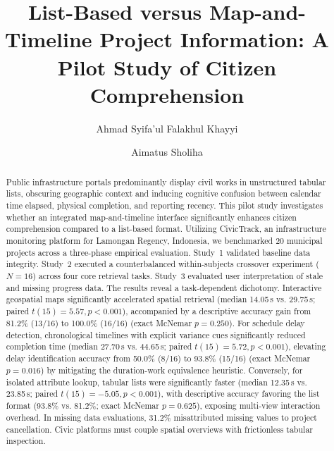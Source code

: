 \documentclass[runningheads]{llncs}
\begin{document}
%
\title{List-Based versus Map-and-Timeline Project Information: A Pilot Study of Citizen Comprehension}
%
%
\author{Ahmad Syifa'ul Falakhul Khayyi \and Aimatus Sholiha}
%
%
%
\maketitle              %
%
\begin{abstract}
Public infrastructure portals predominantly display civil works in unstructured tabular lists, obscuring geographic context and inducing cognitive confusion between calendar time elapsed, physical completion, and reporting recency. This pilot study investigates whether an integrated map-and-timeline interface significantly enhances citizen comprehension compared to a list-based format. Utilizing CivicTrack, an infrastructure monitoring platform for Lamongan Regency, Indonesia, we benchmarked 20 municipal projects across a three-phase empirical evaluation. Study~1 validated baseline data integrity. Study~2 executed a counterbalanced within-subjects crossover experiment ($N = 16$) across four core retrieval tasks. Study~3 evaluated user interpretation of stale and missing progress data. The results reveal a task-dependent dichotomy. Interactive geospatial maps significantly accelerated spatial retrieval (median 14.05\,s vs. 29.75\,s; paired $t(15) = 5.57, p < 0.001$), accompanied by a descriptive accuracy gain from 81.2\% (13/16) to 100.0\% (16/16) (exact McNemar $p = 0.250$). For schedule delay detection, chronological timelines with explicit variance cues significantly reduced completion time (median 27.70\,s vs. 44.65\,s; paired $t(15) = 5.72, p < 0.001$), elevating delay identification accuracy from 50.0\% (8/16) to 93.8\% (15/16) (exact McNemar $p = 0.016$) by mitigating the duration-work equivalence heuristic. Conversely, for isolated attribute lookup, tabular lists were significantly faster (median 12.35\,s vs. 23.85\,s; paired $t(15) = -5.05, p < 0.001$), with descriptive accuracy favoring the list format (93.8\% vs. 81.2\%; exact McNemar $p = 0.625$), exposing multi-view interaction overhead. In missing data evaluations, 31.2\% misattributed missing values to project cancellation. Civic platforms must couple spatial overviews with frictionless tabular inspection.

\end{abstract}
%
%
%
\end{document}
